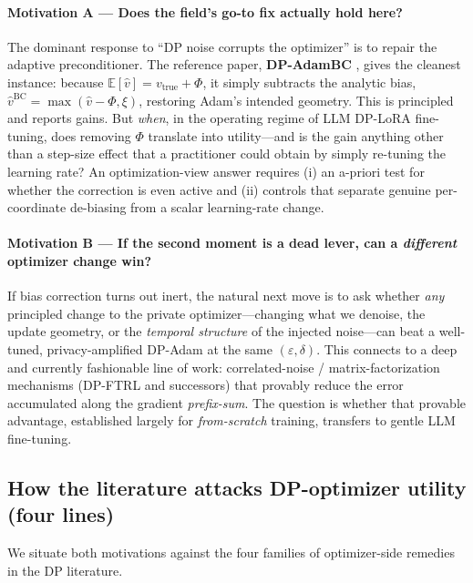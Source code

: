 \documentclass[11pt]{article}
\newcommand{\E}{\mathbb{E}}
\theoremstyle{plain}
\theoremstyle{definition}
\theoremstyle{remark}
\begin{document}
\paragraph{Motivation A --- Does the field's go-to fix actually hold here?}
The dominant response to ``DP noise corrupts the optimizer'' is to repair the adaptive
preconditioner. The reference paper, \textbf{DP-AdamBC} \citep{tang2024dpadambc}, gives the cleanest
instance: because $\E[\hat v]=v_{\mathrm{true}}+\Phi$, it simply subtracts the analytic bias,
$\hat v^{\mathrm{BC}}=\max(\hat v-\Phi,\xi)$, restoring Adam's intended geometry. This is principled
and reports gains. But \emph{when}, in the operating regime of LLM DP-LoRA fine-tuning, does
removing $\Phi$ translate into utility---and is the gain anything other than a step-size effect that
a practitioner could obtain by simply re-tuning the learning rate? An optimization-view answer
requires (i) an a-priori test for whether the correction is even active and (ii) controls that
separate genuine per-coordinate de-biasing from a scalar learning-rate change.

\paragraph{Motivation B --- If the second moment is a dead lever, can a \emph{different}
optimizer change win?}
If bias correction turns out inert, the natural next move is to ask whether \emph{any} principled
change to the private optimizer---changing what we denoise, the update geometry, or the
\emph{temporal structure} of the injected noise---can beat a well-tuned, privacy-amplified DP-Adam
at the same $(\varepsilon,\delta)$. This connects to a deep and currently fashionable line of work:
correlated-noise / matrix-factorization mechanisms (DP-FTRL and successors) that provably reduce the
error accumulated along the gradient \emph{prefix-sum}. The question is whether that provable
advantage, established largely for \emph{from-scratch} training, transfers to gentle LLM fine-tuning.

\subsection*{How the literature attacks DP-optimizer utility (four lines)}

We situate both motivations against the four families of optimizer-side remedies in the DP literature.
\end{document}
